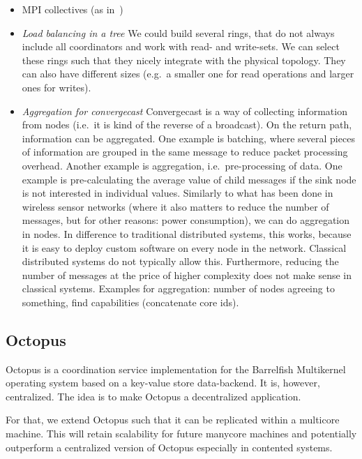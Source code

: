 \documentclass{article}
\begin{document}
\begin{itemize}
\begin{itemize}
  \end{itemize}
\item MPI collectives (as in~\cite{Tu2008})
\item \emph{Load balancing in a tree} We could build several rings,
  that do not always include all coordinators and work with read- and
  write-sets. We can select these rings such that they nicely
  integrate with the physical topology. They can also have different
  sizes (e.g.\ a smaller one for read operations and larger ones for
  writes).
\item \emph{Aggregation for convergecast} %
  Convergecast is a way of collecting information from nodes (i.e.\ it
  is kind of the reverse of a broadcast). On the return path,
  information can be aggregated. One example is batching, where several
  pieces of information are grouped in the same message to reduce packet
  processing overhead. Another example is aggregation, i.e.\
  pre-processing of data. One example is pre-calculating the average
  value of child messages if the sink node is not interested in
  individual values. %
  Similarly to what has been done in wireless sensor networks (where it
  also matters to reduce the number of messages, but for other reasons:
  power consumption), we can do aggregation in nodes. In difference to
  traditional distributed systems, this works, because it is easy to
  deploy custom software on every node in the network. Classical
  distributed systems do not typically allow this. Furthermore, reducing
  the number of messages at the price of higher complexity does not make
  sense in classical systems. %
  Examples for aggregation: number of nodes agreeing to something, find
  capabilities (concatenate core ids). 
\end{itemize}

\subsection{Octopus}

Octopus is a coordination service implementation for the Barrelfish
Multikernel operating system based on a key-value store
data-backend. It is, however, centralized. The idea is to make Octopus
a decentralized application.

For that, we extend Octopus such that it can be replicated within a
multicore machine. This will retain scalability for future manycore
machines and potentially outperform a centralized version of Octopus
especially in contented systems.
\end{document}
